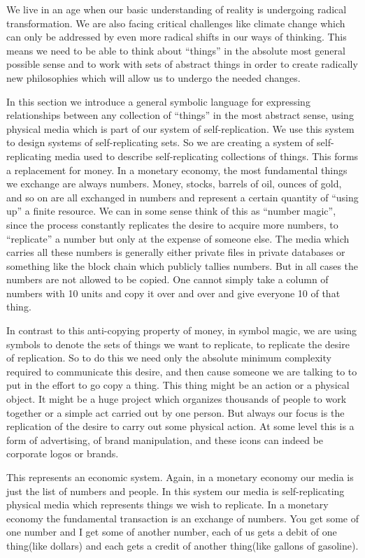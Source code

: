 
We live in an age when our basic understanding of reality is undergoing
radical transformation. We are also facing critical challenges like
climate change which can only be addressed by even more radical shifts
in our ways of thinking. This means we need to be able to think about
``things'' in the absolute most general possible sense and to work with
sets of abstract things in order to create radically new philosophies
which will allow us to undergo the needed changes.

In this section we introduce a general symbolic language for expressing
relationships between any collection of ``things'' in the most abstract
sense, using physical media which is part of our system of
self-replication. We use this system to design systems of
self-replicating sets. So we are creating a system of self-replicating
media used to describe self-replicating collections of things. This
forms a replacement for money. In a monetary economy, the most
fundamental things we exchange are always numbers. Money, stocks,
barrels of oil, ounces of gold, and so on are all exchanged in numbers
and represent a certain quantity of ``using up'' a finite resource. We
can in some sense think of this as ``number magic'', since the process
constantly replicates the desire to acquire more numbers, to
``replicate'' a number but only at the expense of someone else. The
media which carries all these numbers is generally either private files
in private databases or something like the block chain which publicly
tallies numbers. But in all cases the numbers are not allowed to be
copied. One cannot simply take a column of numbers with 10 units and
copy it over and over and give everyone 10 of that thing.

In contrast to this anti-copying property of money, in symbol magic, we
are using symbols to denote the sets of things we want to replicate, to
replicate the desire of replication. So to do this we need only the
absolute minimum complexity required to communicate this desire, and
then cause someone we are talking to to put in the effort to go copy a
thing. This thing might be an action or a physical object. It might be a
huge project which organizes thousands of people to work together or a
simple act carried out by one person. But always our focus is the
replication of the desire to carry out some physical action. At some
level this is a form of advertising, of brand manipulation, and these
icons can indeed be corporate logos or brands.

This represents an economic system. Again, in a monetary economy our
media is just the list of numbers and people. In this system our media
is self-replicating physical media which represents things we wish to
replicate. In a monetary economy the fundamental transaction is an
exchange of numbers. You get some of one number and I get some of
another number, each of us gets a debit of one thing(like dollars) and
each gets a credit of another thing(like gallons of gasoline).

